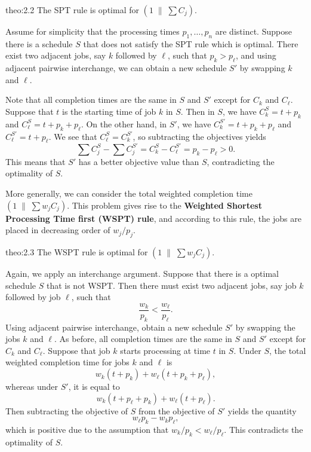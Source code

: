 \begin{theo}{theo:2.2}
    The SPT rule is optimal for $(1\;\|\;\sum C_j)$. 
\end{theo}
\begin{pf}
    Assume for simplicity that the processing times $p_1, \dots, p_n$ are 
    distinct. Suppose there is a schedule $S$ that does not satisfy the 
    SPT rule which is optimal. There exist two adjacent jobs, say $k$ followed 
    by $\ell$, such that $p_k > p_\ell$, and using adjacent pairwise 
    interchange, we can obtain a new schedule $S'$ by swapping $k$ and $\ell$. 

    Note that all completion times are the same in $S$ and $S'$ except for 
    $C_k$ and $C_\ell$. Suppose that $t$ is the starting time of job $k$ 
    in $S$. Then in $S$, we have $C_k^S = t + p_k$ and $C_\ell^S = t + p_k + 
    p_\ell$. On the other hand, in $S'$, we have $C_k^{S'} = t + p_k + p_\ell$ 
    and $C_\ell^{S'} = t + p_\ell$. We see that $C_\ell^S = C_k^{S'}$, 
    so subtracting the objectives yields 
    \[ \sum C_j^S - \sum C_j^{S'} = C_k^S - C_\ell^{S'} = p_k - p_\ell > 0. \] 
    This means that $S'$ has a better objective value than $S$, contradicting 
    the optimality of $S$. 
\end{pf}

More generally, we can consider the total weighted completion time 
$(1\;\|\;\sum w_j C_j)$. This problem gives rise to the {\bf Weighted 
Shortest Processing Time first (WSPT) rule}, and according to this rule, 
the jobs are placed in decreasing order of $w_j/p_j$. 

\begin{theo}{theo:2.3}
    The WSPT rule is optimal for $(1\;\|\;\sum w_j C_j)$. 
\end{theo}
\begin{pf}
    Again, we apply an interchange argument. Suppose that there is a optimal 
    schedule $S$ that is not WSPT. Then there must exist two adjacent 
    jobs, say job $k$ followed by job $\ell$, such that 
    \[ \frac{w_k}{p_k} < \frac{w_\ell}{p_\ell}. \] 
    Using adjacent pairwise interchange, obtain a new schedule $S'$ by 
    swapping the jobs $k$ and $\ell$. As before, all completion times 
    are the same in $S$ and $S'$ except for $C_k$ and $C_\ell$. 
    Suppose that job $k$ starts processing at time $t$ in $S$. Under $S$, 
    the total weighted completion time for jobs $k$ and $\ell$ is 
    \[ w_k(t + p_k) + w_\ell(t + p_k + p_\ell), \] 
    whereas under $S'$, it is equal to 
    \[ w_k(t + p_\ell + p_k) + w_\ell(t + p_\ell). \] 
    Then subtracting the objective of $S$ from the objective of $S'$ yields 
    the quantity 
    \[ w_\ell p_k - w_k p_\ell, \] 
    which is positive due to the assumption that $w_k/p_k < w_\ell/p_\ell$. 
    This contradicts the optimality of $S$. 
\end{pf}

